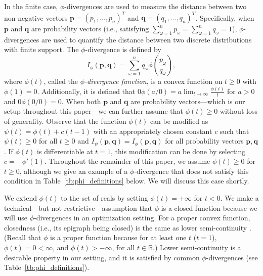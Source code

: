 \documentclass[opre,nonblindrev]{informs3} %
\newcommand{\q}{\mathbf{q}}
\newcommand{\p}{\mathbf{p}}
\begin{document}
In the finite case, $\phi$-divergences are used to measure the distance between two non-negative vectors $\p = (p_1, \dots, p_n)^T$ and $\q = (q_1, \dots, q_n)^T$.
Specifically, when $\p$ and $\q$ are probability vectors (i.e., satisfying $\sum_{\omega=1}^n p_\omega = \sum_{\omega=1}^n q_\omega = 1$), $\phi$-divergences are used to quantify the distance between two discrete distributions with finite support. 
The $\phi$-divergence is defined by
\[
	I_\phi(\p,\q) = \sum_{\omega=1}^n q_\omega \phi\left(\frac{p_\omega}{q_\omega}\right),
\]
where $\phi(t)$, called the {\it $\phi$-divergence function}, is a convex function on $t \geq 0$ with $\phi(1) = 0$.
Additionally, it is defined that $0 \phi(a/0) = a \lim_{t \rightarrow \infty} \frac{\phi(t)}{t}$ for $a>0$ and $0 \phi(0/0) = 0$.
When both $\p$ and $\q$ are probability vectors---which is our setup throughout this paper---we can further assume that $\phi(t) \geq 0$ without loss of generality. 
Observe that the function $\phi(t)$ can be modified as $\psi(t) = \phi(t) + c(t-1)$ with an appropriately chosen constant $c$ such that $\psi(t) \geq 0$ for all $t\geq 0$ and $I_\psi(\p,\q) = I_\phi(\p,\q)$ for all probability vectors $\p,\q$.
If $\phi(t)$ is differentiable at $t = 1$, this modification can be done by selecting $c = -\phi'(1)$.
Throughout the remainder of this paper, we assume $\phi(t) \geq 0$ for $t\geq 0$, although we give an example of a $\phi$-divergence that does not satisfy this condition in Table~\ref{tb:phi_definitions} below. 
We will discuss this case shortly. 

We extend $\phi(t)$ to the set of reals by setting $\phi(t)=+\infty$ for $t<0$.
We make a technical---but not restrictive---assumption 
that $\phi$ is a closed function because we will use $\phi$-divergences in an optimization setting. 
For a proper convex function, closedness (i.e., its epigraph being closed) is the same as lower semi-continuity \citep{rockafellar_70}. 
(Recall that $\phi$ is a proper function because for at least one $t$ ($t=1$), $\phi(t)=0<\infty$, and $\phi(t)>-\infty$, for all $t\in\mathbb{R}$.)
Lower semi-continuity is a desirable property in our setting, and it is satisfied by common $\phi$-divergences (see Table~\ref{tb:phi_definitions}).
  
\end{document}
